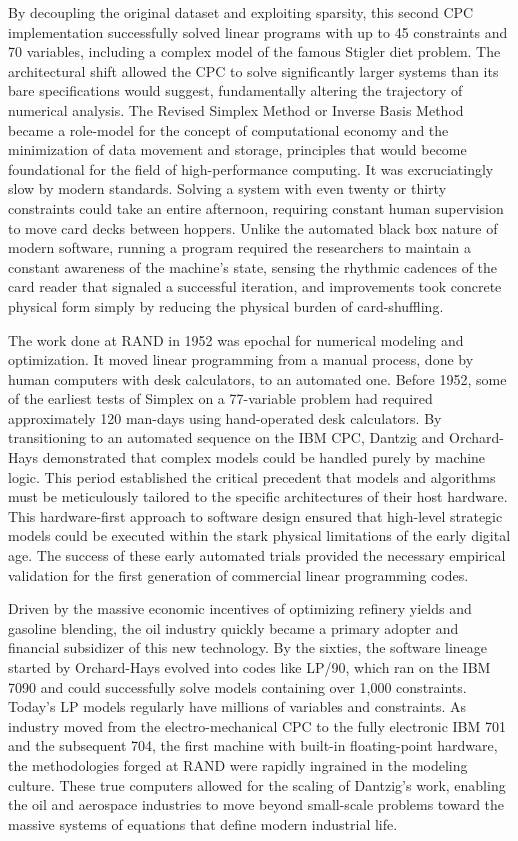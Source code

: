 By decoupling the original dataset and exploiting sparsity, this second CPC implementation successfully solved linear programs with up to 45 constraints and 70 variables, including a complex model of the famous Stigler diet problem. The architectural shift allowed the CPC to solve significantly larger systems than its bare specifications would suggest, fundamentally altering the trajectory of numerical analysis. The Revised Simplex Method or Inverse Basis Method became a role-model for the concept of computational economy and the minimization of data movement and storage, principles that would become foundational for the field of high-performance computing. It was excruciatingly slow by modern standards. Solving a system with even twenty or thirty constraints could take an entire afternoon, requiring constant human supervision to move card decks between hoppers. Unlike the automated black box nature of modern software, running a program required the researchers to maintain a constant awareness of the machine's state, sensing the rhythmic cadences of the card reader that signaled a successful iteration, and improvements took concrete physical form simply by reducing the physical burden of card-shuffling. 

The work done at RAND in 1952 was epochal for numerical modeling and optimization. It moved linear programming from a manual process, done by human computers with desk calculators, to an automated one. Before 1952, some of the earliest tests of Simplex on a 77-variable problem had required approximately 120 man-days using hand-operated desk calculators. By transitioning to an automated sequence on the IBM CPC, Dantzig and Orchard-Hays demonstrated that complex models could be handled purely by machine logic. This period established the critical precedent that models and algorithms must be meticulously tailored to the specific architectures of their host hardware. This hardware-first approach to software design ensured that high-level strategic models could be executed within the stark physical limitations of the early digital age. The success of these early automated trials provided the necessary empirical validation for the first generation of commercial linear programming codes.

Driven by the massive economic incentives of optimizing refinery yields and gasoline blending, the oil industry quickly became a primary adopter and financial subsidizer of this new technology. By the sixties, the software lineage started by Orchard-Hays evolved into codes like LP/90, which ran on the IBM 7090 and could successfully solve models containing over 1,000 constraints. Today’s LP models regularly have millions of variables and constraints. As industry moved from the electro-mechanical CPC to the fully electronic IBM 701 and the subsequent 704, the first machine with built-in floating-point hardware, the methodologies forged at RAND were rapidly ingrained in the modeling culture. These true computers allowed for the scaling of Dantzig's work, enabling the oil and aerospace industries to move beyond small-scale problems toward the massive systems of equations that define modern industrial life. 

